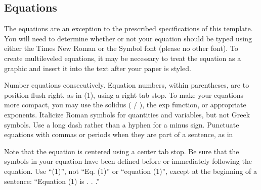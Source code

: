 \documentclass[10pt, conference, a4paper, compsocconf]{IEEEtran}
\begin{document}
\subsection{Equations}
The equations are an exception to the prescribed specifications of this template. You will need to determine whether or not your equation should be typed using either the Times New Roman or the Symbol font (please no other font). To create multileveled equations, it may be necessary to treat the equation as a graphic and insert it into the text after your paper is styled.

Number equations consecutively. Equation numbers, within parentheses, are to position flush right, as in (1), using a right tab stop. To make your equations more compact, you may use the solidus ( / ), the exp function, or appropriate exponents. Italicize Roman symbols for quantities and variables, but not Greek symbols. Use a long dash rather than a hyphen for a minus sign. Punctuate equations with commas or periods when they are part of a sentence, as in

Note that the equation is centered using a center tab stop. Be sure that the symbols in your equation have been defined before or immediately following the equation. Use “(1)”, not “Eq. (1)” or “equation (1)”, except at the beginning of a sentence: “Equation (1) is . . .”
\end{document}
